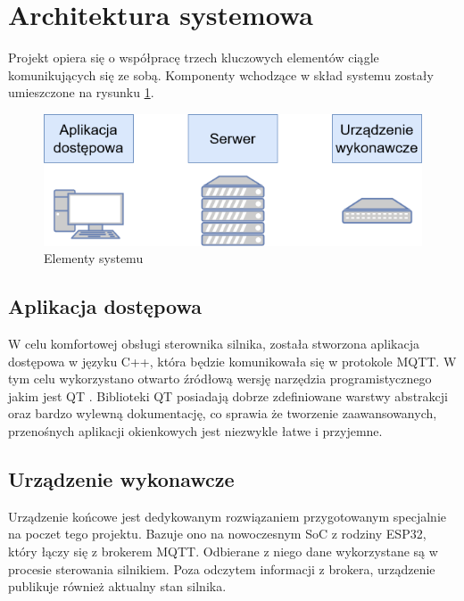  

 

    \section{Architektura systemowa}
        Projekt opiera się o współpracę trzech kluczowych elementów ciągle komunikujących się ze sobą. Komponenty wchodzące w skład systemu zostały umieszczone na rysunku \ref{fig:system}.
        
        \begin{figure}[ht]
          \centering
          \includegraphics[width=1\textwidth]{img/system.png}
          \caption{Elementy systemu}
          \label{fig:system}
        \end{figure}


        \subsection{Aplikacja dostępowa}
            W celu komfortowej obsługi sterownika silnika, została stworzona aplikacja dostępowa w języku C++, która będzie komunikowała się w protokole MQTT. W tym celu wykorzystano otwarto źródłową wersję narzędzia programistycznego jakim jest QT \cite{qt}. Biblioteki QT posiadają dobrze zdefiniowane warstwy abstrakcji oraz bardzo wylewną dokumentację, co sprawia że tworzenie zaawansowanych, przenośnych aplikacji okienkowych jest niezwykle łatwe i przyjemne.
        
        \subsection{Urządzenie wykonawcze}
            Urządzenie końcowe jest dedykowanym rozwiązaniem przygotowanym specjalnie na poczet tego projektu. Bazuje ono na nowoczesnym SoC z rodziny ESP32, który łączy się z brokerem MQTT. Odbierane z niego dane wykorzystane są w procesie sterowania silnikiem. Poza odczytem informacji z brokera, urządzenie publikuje również aktualny stan silnika.
        
